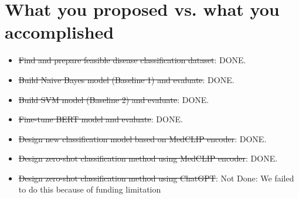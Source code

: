 \documentclass[11pt,a4paper]{article}
\begin{document}
\section{What you proposed vs. what you accomplished}

\begin{itemize}
\item \sout{Find and prepare feasible disease classification dataset}: DONE.
\item \sout{Build Naive Bayes model (Baseline 1) and evaluate}: DONE.

\item \sout{Build SVM model (Baseline 2) and evaluate}: DONE.

\item \sout{Fine-tune BERT model and evaluate}: DONE.

\item \sout{Design new classification model based on MedCLIP encoder}: DONE.

\item \sout{Design zero-shot classification method using MedCLIP encoder}: DONE.

\item \sout{Design zero-shot classification method using ChatGPT}:  Not Done: We failed to do this because of funding limitation

\end{itemize}

\end{document}
